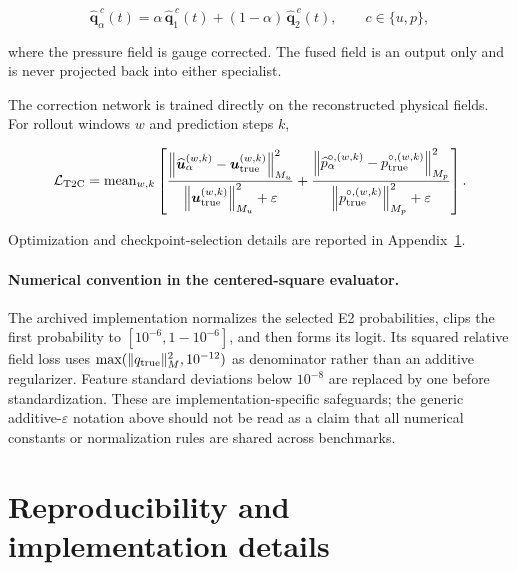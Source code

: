 \documentclass{article}
\providecommand{\DIFaddtex}[1]{{\protect\color{blue} \sf #1}} %
\providecommand{\DIFaddbegin}{} %
\providecommand{\DIFaddend}{} %
\providecommand{\DIFadd}[1]{\texorpdfstring{\DIFaddtex{#1}}{#1}} %
\begin{document}
\begin{equation}
  \widehat{\bm q}_{\alpha}^{\,c}(t)
  =
  \alpha\,
  \widehat{\bm q}_{1}^{\,c}(t)
  +
  (1-\alpha)\,
  \widehat{\bm q}_{2}^{\,c}(t),
  \qquad
  c\in\{u,p\},
  \label{eq:app_t2c_field_fusion}
\end{equation}


where the pressure field is gauge corrected.
The fused field is an output only and is never projected back into either
specialist.

The correction network is trained directly on the reconstructed physical
fields. For rollout windows $w$ and prediction steps $k$,


\begin{equation}
  \mathcal L_{\rm T2C}
  =
  \operatorname{mean}_{w,k}
  \left[
    \frac{
      \left\|
        \widehat{\bm u}_{\alpha}^{(w,k)}
        -
        \bm u_{\rm true}^{(w,k)}
      \right\|_{M_u}^2
    }{
      \left\|
        \bm u_{\rm true}^{(w,k)}
      \right\|_{M_u}^2+\varepsilon
    }
    +
    \frac{
      \left\|
        \widehat p_{\alpha}^{\circ,(w,k)}
        -
        p_{\rm true}^{\circ,(w,k)}
      \right\|_{M_p}^2
    }{
      \left\|
        p_{\rm true}^{\circ,(w,k)}
      \right\|_{M_p}^2+\varepsilon
    }
  \right].
  \label{eq:app_t2c_loss}
\end{equation}


Optimization and checkpoint-selection details are reported in
Appendix~\ref{app:implementation}.

\DIFaddbegin \paragraph{\DIFadd{Numerical convention in the centered-square evaluator.}}
\DIFadd{The archived implementation normalizes the selected E2 probabilities, clips the first probability to $[10^{-6},1-10^{-6}]$, and then forms its logit. Its squared relative field loss uses $\max(\|q_{\rm true}\|_M^2,10^{-12})$ as denominator rather than an additive regularizer. Feature standard deviations below $10^{-8}$ are replaced by one before standardization. These are implementation-specific safeguards; the generic additive-$\varepsilon$ notation above should not be read as a claim that all numerical constants or normalization rules are shared across benchmarks.
}

\DIFaddend \section{Reproducibility and implementation details}
\label{app:implementation}
\end{document}
